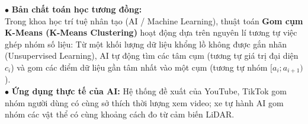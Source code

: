\documentclass[12pt, a4paper]{article}
\begin{document}
\begin{aibox}
    $\bullet$ \textbf{Bản chất toán học tương đồng:}\\
    Trong khoa học trí tuệ nhân tạo (AI / Machine Learning), thuật toán \textbf{Gom cụm K-Means (K-Means Clustering)} hoạt động dựa trên nguyên lí tương tự việc ghép nhóm số liệu: Từ một khối lượng dữ liệu khổng lồ không được gắn nhãn (Unsupervised Learning), AI tự động tìm các tâm cụm (tương tự giá trị đại diện $c_i$) và gom các điểm dữ liệu gần tâm nhất vào một cụm (tương tự nhóm $[a_i; a_{i+1})$).\\
    $\bullet$ \textbf{Ứng dụng thực tế của AI:} Hệ thống đề xuất của YouTube, TikTok gom nhóm người dùng có cùng sở thích thời lượng xem video; xe tự hành AI gom nhóm các vật thể có cùng khoảng cách đo từ cảm biến LiDAR.
\end{aibox}
\end{document}

